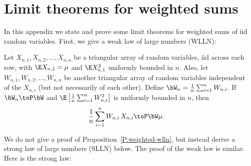 \chapter{Limit theorems for weighted sums}\label{A:weighted-sums}

In this appendix we state and prove some limit theorems for weighted sums
of iid random variables.  First, we give a weak law of large numbers (WLLN):

\begin{proposition}\label{P:weighted-wlln}
    Let $X_{n,1}, X_{n,2}, \ldots, X_{n,n}$ be a triangular array of random
    variables, iid across each row, with $\E X_{n,1} = \mu$ and $\E 
    X_{n,1}^2$  uniformly bounded in $n$.  Also, let $W_{n,1}, W_{n,2}, \ldots, 
    W_{n,n}$ be another triangular array of random variables independent of 
    the $X_{n,i}$ (but not necessarily of each other).  Define 
    \(
        \bW_n = \frac{1}{n} \sum_{i=1}^n W_{n,i}.
    \) 
    If $\bW_n \toP \bW$ and 
    $\E \left[ \frac{1}{n} \sum_{i=1}^n W_{n,i}^2 \right]$ is uniformly 
    bounded in $n$, then
    \[
        \frac{1}{n} \sum_{i=1}^n W_{n,i} \, X_{n,i} \toP \bW \mu.
    \]
\end{proposition}

We do not give a proof of Proposition~\ref{P:weighted-wlln}, but instead derive a strong law of large numbers (SLLN) below.  The proof of the weak law is similar.  Here is the strong law:

